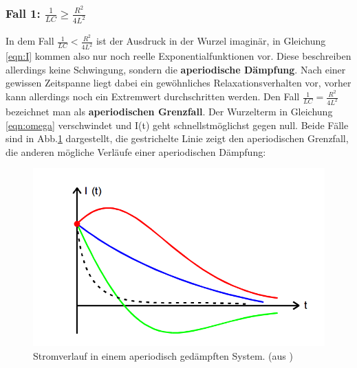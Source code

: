 \subsubsection{Fall 1: $\frac{1}{LC} \ge \frac{R^2}{4L^2}$}

In dem Fall $\frac{1}{LC}<\frac{R^2}{4L^2}$ ist der Ausdruck in der
Wurzel imaginär, in Gleichung
\ref{eqn:I} kommen also nur noch reelle Exponentialfunktionen vor. Diese
beschreiben allerdings keine Schwingung, sondern die
\textbf{aperiodische Dämpfung}. Nach einer gewissen Zeitspanne liegt dabei ein
gewöhnliches Relaxationsverhalten vor, vorher kann allerdings noch ein Extremwert
durchschritten werden.
Den Fall $\frac{1}{LC}=\frac{R^2}{4L^2}$ bezeichnet man als
\textbf{aperiodischen Grenzfall}. Der Wurzelterm in Gleichung \ref{eqn:omega}
verschwindet und I(t) geht schnellstmöglichst gegen null.
Beide Fälle sind in Abb.\ref{fig:aper} dargestellt, die gestrichelte Linie zeigt
den aperiodischen Grenzfall, die anderen mögliche Verläufe einer aperiodischen
Dämpfung:
\begin{figure}
  \centering
  \includegraphics{aperiode.png}
  \caption{Stromverlauf in einem aperiodisch gedämpften System.
  (aus \cite{protokoll})}
  \label{fig:aper}
\end{figure}

